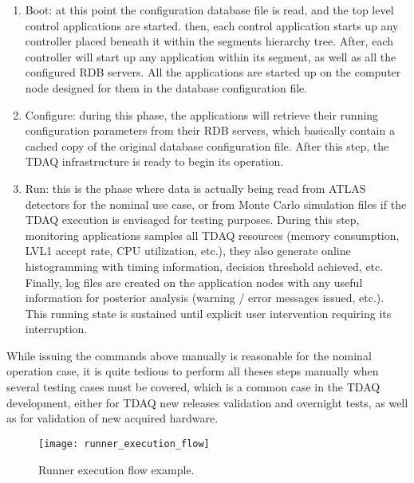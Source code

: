 \begin{enumerate}

\item Boot: at this point the configuration database file is read, and the top level control applications are started. then, each control application starts up any controller placed beneath it within the segments hierarchy tree. After, each controller will start up any application within its segment, as well as all the configured RDB servers. All the applications are started up on the computer node designed for them in the database configuration file.

\item Configure: during this phase, the applications will retrieve their running configuration parameters from their RDB servers, which basically contain a cached copy of the original database configuration file. After this step, the TDAQ infrastructure is ready to begin its operation.

\item Run: this is the phase where data is actually being read from ATLAS detectors for the nominal use case, or from Monte Carlo simulation files if the TDAQ execution is envisaged for testing purposes. During this step, monitoring applications samples all TDAQ resources (memory consumption, LVL1 accept rate, CPU utilization, etc.), they also generate online histogramming with timing information, decision threshold achieved, etc. Finally, log files are created on the application nodes with any useful information for posterior analysis (warning / error messages issued, etc.). This running state is sustained until explicit user intervention requiring its interruption.

\end{enumerate}

While issuing the commands above manually is reasonable for the nominal operation case, it is quite tedious to perform all theses steps manually when several testing cases must be covered, which is a common case in the TDAQ development, either for TDAQ new releases validation and overnight tests, as well as for validation of new acquired hardware.

\begin{figure}
\begin{center}
\texttt{[image: runner\_execution\_flow]}
\end{center}
\caption{Runner execution flow example.}
\label{fig:runner_exec_flow}
\end{figure}

